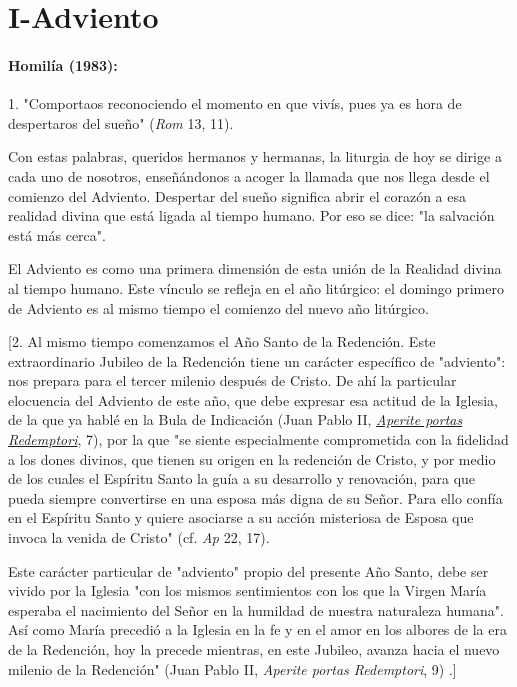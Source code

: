 \chapter{I-Adviento}

\subsubsection{Homilía (1983): }


\begin{body} 
	1. "Comportaos reconociendo el momento en que vivís, pues ya es hora de despertaros del sueño" (\emph{Rom} 13, 11).
	
	Con estas palabras, queridos hermanos y hermanas, la liturgia de hoy se dirige a cada uno de nosotros, enseñándonos a acoger la llamada que nos llega desde el comienzo del Adviento. Despertar del sueño significa abrir el corazón a esa realidad divina que está ligada al tiempo humano. Por eso se dice: "la salvación está más cerca".
	
	El Adviento es como una primera dimensión de esta unión de la Realidad divina al tiempo humano. Este vínculo se refleja en el año litúrgico: el domingo primero de Adviento es al mismo tiempo el comienzo del nuevo año litúrgico.
	
	{[}2. Al mismo tiempo comenzamos el Año Santo de la Redención. Este extraordinario Jubileo de la Redención tiene un carácter específico de "adviento": nos prepara para el tercer milenio después de Cristo. De ahí la particular elocuencia del Adviento de este año, que debe expresar esa actitud de la Iglesia, de la que ya hablé en la Bula de Indicación (Juan Pablo II, \href{http://www.vatican.va/content/john-paul-ii/it/jubilee/documents/hf_jp-ii_doc_19830106_bolla-redenzione.html}{\emph{\emph{Aperite portas Redemptori}}}, 7), por la que "se siente especialmente comprometida con la fidelidad a los dones divinos, que tienen su origen en la redención de Cristo, y por medio de los cuales el Espíritu Santo la guía a su desarrollo y renovación, para que pueda siempre convertirse en una esposa más digna de su Señor. Para ello confía en el Espíritu Santo y quiere asociarse a su acción misteriosa de Esposa que invoca la venida de Cristo" (cf. \emph{Ap} 22, 17).
	
	Este carácter particular de "adviento" propio del presente Año Santo, debe ser vivido por la Iglesia "con los mismos sentimientos con los que la Virgen María esperaba el nacimiento del Señor en la humildad de nuestra naturaleza humana". Así como María precedió a la Iglesia en la fe y en el amor en los albores de la era de la Redención, hoy la precede mientras, en este Jubileo, avanza hacia el nuevo milenio de la Redención" (Juan Pablo II, \emph{Aperite portas Redemptori}, 9) .{]}
	

\end{body}
